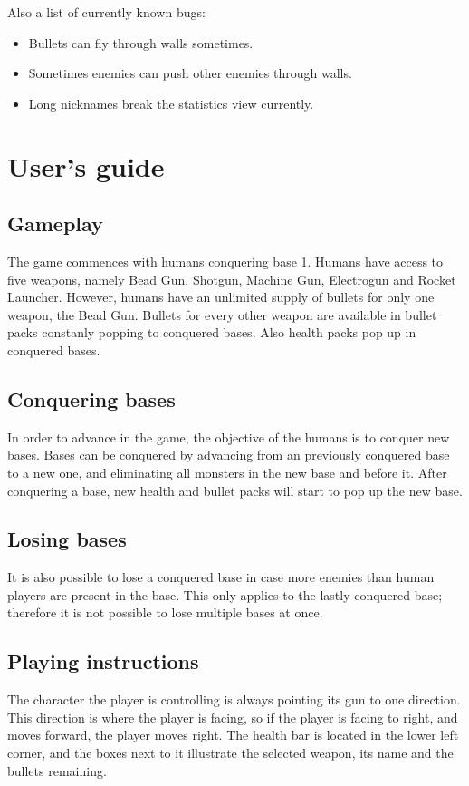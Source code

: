 \documentclass[a4paper,12pt,titlepage]{article}
\begin{document}
Also a list of currently known bugs:
\begin{itemize}
\item Bullets can fly through walls sometimes.
\item Sometimes enemies can push other enemies through walls.
\item Long nicknames break the statistics view currently.
\end{itemize}


\section{User's guide}

\subsection{Gameplay}
The game commences with humans conquering base 1. Humans have access to five weapons, namely Bead Gun, Shotgun, Machine Gun, Electrogun and Rocket Launcher. However, humans have an unlimited supply of bullets for only one weapon, the Bead Gun. Bullets for every other weapon are available in bullet packs constanly popping to conquered bases. Also health packs pop up in conquered bases.

\subsection{Conquering bases}
In order to advance in the game, the objective of the humans is to conquer new bases. Bases can be conquered by advancing from an previously conquered base to a new one, and eliminating all monsters in the new base and before it. After conquering a base, new health and bullet packs will start to pop up the new base.

\subsection{Losing bases}
It is also possible to lose a conquered base in case more enemies than human players are present in the base. This only applies to the lastly conquered base; therefore it is not possible to lose multiple bases at once.

\subsection{Playing instructions}
The character the player is controlling is always pointing its gun to one direction. This direction is where the player is facing, so if the player is facing to right, and moves forward, the player moves right. The health bar is located in the lower left corner, and the boxes next to it illustrate the selected weapon, its name and the bullets remaining.
\end{document}
